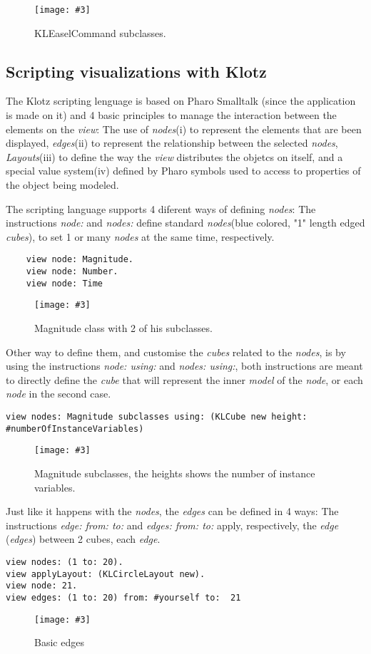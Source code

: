 \documentclass[runningheads]{llncs}
\newcommand{\fig}[4]{
	\begin{figure}[#1]
		\centering
		\texttt{[image: \#3]}
		\caption{\label{fig:#3}#4}
	\end{figure}}
\newcommand{\seclabel}[1]{\label{sec:#1}}
\begin{document}
\fig{}{0.5}{figure1.png}{KLEaselCommand subclasses.}


\subsection{Scripting visualizations with Klotz} \seclabel{scripting}
The Klotz scripting lenguage is based on Pharo Smalltalk
(since the application is made on it) and 4 basic principles
to manage the interaction between the elements on the \emph{view}:
The use of \emph{nodes}(i) to represent the elements that are been
displayed, \emph{edges}(ii) to represent the relationship between
the selected \emph{nodes}, \emph{Layouts}(iii) to define the way the
\emph{view} distributes the objetcs on itself, and a special value
system(iv) defined by Pharo symbols used to access to properties of
the object being modeled.  

The scripting language supports 4 diferent ways of defining \emph{nodes}:
The instructions \emph{node:} and \emph{nodes:} define standard 
\emph{nodes}(blue colored, "1" length edged \emph{cubes}), to set 1 or many 
\emph{nodes} at the same time, respectively.
\begin{lstlisting}
	view node: Magnitude.
	view node: Number.
	view node: Time    
\end{lstlisting}
\fig{}{0.3}{figure2.png}{Magnitude class with 2 of his subclasses.}
Other way to define them, and customise the \emph{cubes} related to the 
\emph{nodes}, is by using the instructions \emph{node: using:} and 
\emph{nodes: using:}, both instructions are meant to directly define 
the \emph{cube} that will represent the inner \emph{model} of the \emph{node}, 
or each \emph{node} in the second case.
\begin{lstlisting}
view nodes: Magnitude subclasses using: (KLCube new height: #numberOfInstanceVariables)    
\end{lstlisting}
\fig{}{0.5}{figure3.png}{Magnitude subclasses, the heights shows the number of instance variables.}

Just like it happens with the \emph{nodes}, the \emph{edges} can be defined in 
4 ways: The instructions \emph{edge: from: to:} and \emph{edges: from: to:} 
apply, respectively, the \emph{edge} (\emph{edges}) between 2 cubes, each \emph{edge}.
\begin{lstlisting}
view nodes: (1 to: 20).
view applyLayout: (KLCircleLayout new).	
view node: 21.
view edges: (1 to: 20) from: #yourself to:  21
\end{lstlisting}
\fig{}{0.5}{figure4.png}{Basic edges}
\end{document}
